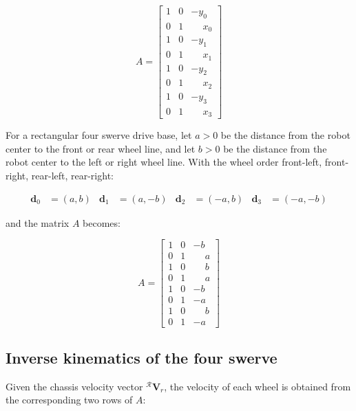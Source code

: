 \documentclass[11pt,a4paper]{article}
\newcommand{\vect}[1]{\bm{#1}}       %
\newcommand{\frameR}{\mathcal{R}}
\begin{document}
\begin{equation}
    A =
    \begin{bmatrix}
        1 & 0 & -y_0           \\
        0 & 1 & \phantom{-}x_0 \\
        1 & 0 & -y_1           \\
        0 & 1 & \phantom{-}x_1 \\
        1 & 0 & -y_2           \\
        0 & 1 & \phantom{-}x_2 \\
        1 & 0 & -y_3           \\
        0 & 1 & \phantom{-}x_3
    \end{bmatrix}
\end{equation}

For a rectangular four swerve drive base, let \(a > 0\) be the distance from the
robot center to the front or rear wheel line, and let \(b > 0\) be the distance
from the robot center to the left or right wheel line. With the wheel order
front-left, front-right, rear-left, rear-right:

\[
    \begin{aligned}
        \vect{d}_0 & = (a, b)   &
        \vect{d}_1 & = (a, -b)  &
        \vect{d}_2 & = (-a, b)  &
        \vect{d}_3 & = (-a, -b)
    \end{aligned}
\]

and the matrix \(A\) becomes:

\begin{equation}
    A =
    \begin{bmatrix}
        1 & 0 & -b           \\
        0 & 1 & \phantom{-}a \\
        1 & 0 & \phantom{-}b \\
        0 & 1 & \phantom{-}a \\
        1 & 0 & -b           \\
        0 & 1 & -a           \\
        1 & 0 & \phantom{-}b \\
        0 & 1 & -a
    \end{bmatrix}
\end{equation}

\subsection{Inverse kinematics of the four swerve}

Given the chassis velocity vector \({}^{\frameR}\vect{V}_r\), the velocity of
each wheel is obtained from the corresponding two rows of \(A\):
\end{document}
